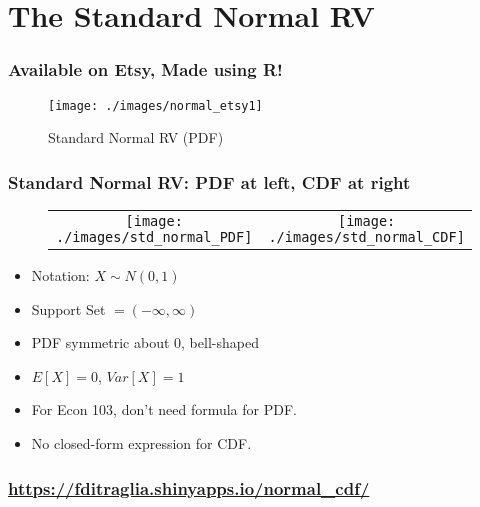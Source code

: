 \section{The Standard Normal RV}
\begin{frame}
  \frametitle{Available on Etsy, Made using R!}
\begin{figure}
\texttt{[image: ./images/normal\_etsy1]}
\caption{Standard Normal RV (PDF)}
\end{figure}
\end{frame}

\begin{frame}

\frametitle{Standard Normal RV: PDF at left, CDF at right}



\begin{figure}[h]
  \centering
  \begin{tabular}{cc}
  \texttt{[image: ./images/std\_normal\_PDF]}
  &  
  \texttt{[image: ./images/std\_normal\_CDF]}
\end{tabular}
\end{figure}


\begin{itemize}
  \item Notation: $X \sim N(0,1)$
  \item Support Set $= (-\infty,\infty)$
  \item PDF symmetric about 0, bell-shaped
  \item $E[X]=0$, $Var[X]=1$
  \item For Econ 103, don't need formula for PDF.
  \item No closed-form expression for CDF.
\end{itemize}
\end{frame}


\begin{frame}
	\frametitle{\href{https://fditraglia.shinyapps.io/normal_cdf/}{https://fditraglia.shinyapps.io/normal\_cdf/}}

\begin{figure}
\end{figure}

\end{frame}

